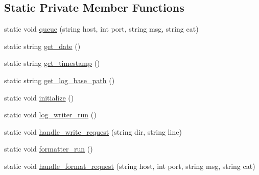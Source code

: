 \subsection*{Static Private Member Functions}
\begin{DoxyCompactItemize}
\item 
static void \hyperlink{classLogger_a28f4a9602314326324efe66cb080b9cd}{queue} (string host, int port, string msg, string cat)
\item 
static string \hyperlink{classLogger_ab029553d98fef32a959c4dd9a9d54eea}{get\_\-date} ()
\item 
static string \hyperlink{classLogger_a227293d7b2941454b62fbb5471711200}{get\_\-timestamp} ()
\item 
static string \hyperlink{classLogger_a3bbf4bde3c17ce025625efdc3651d62a}{get\_\-log\_\-base\_\-path} ()
\item 
static void \hyperlink{classLogger_ae784283f1de7827b7e7049641eaf0a53}{initialize} ()
\item 
static void \hyperlink{classLogger_af1ed54470b81ee4e42d846f0b42e8789}{log\_\-writer\_\-run} ()
\item 
static void \hyperlink{classLogger_a5860ff086efc6bf785ac9e62f4f5bcad}{handle\_\-write\_\-request} (string dir, string line)
\item 
static void \hyperlink{classLogger_a7c152c7936d69ffa5de724143ba39f58}{formatter\_\-run} ()
\item 
static void \hyperlink{classLogger_a8dda3deb5412352e1fea15c000318404}{handle\_\-format\_\-request} (string host, int port, string msg, string cat)
\end{DoxyCompactItemize}

